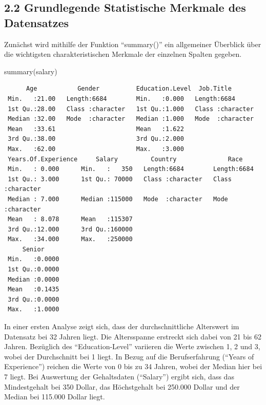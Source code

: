 \documentclass[
  letterpaper,
  DIV=11,
  numbers=noendperiod]{scrartcl}
\newenvironment{Shaded}{\begin{snugshade}}{\end{snugshade}}
\newcommand{\FunctionTok}[1]{\textcolor[rgb]{0.28,0.35,0.67}{#1}}
\newcommand{\NormalTok}[1]{\textcolor[rgb]{0.00,0.23,0.31}{#1}}
\begin{document}
\hypertarget{grundlegende-statistische-merkmale-des-datensatzes}{%
\subsection{2.2 Grundlegende Statistische Merkmale des
Datensatzes}\label{grundlegende-statistische-merkmale-des-datensatzes}}

Zunächst wird mithilfe der Funktion ``summary()'' ein allgemeiner
Überblick über die wichtigsten charakteristischen Merkmale der einzelnen
Spalten gegeben.

\begin{Shaded}
\begin{Highlighting}[]
\FunctionTok{summary}\NormalTok{(salary)}
\end{Highlighting}
\end{Shaded}

\begin{verbatim}
      Age           Gender          Education.Level  Job.Title        
 Min.   :21.00   Length:6684        Min.   :0.000   Length:6684       
 1st Qu.:28.00   Class :character   1st Qu.:1.000   Class :character  
 Median :32.00   Mode  :character   Median :1.000   Mode  :character  
 Mean   :33.61                      Mean   :1.622                     
 3rd Qu.:38.00                      3rd Qu.:2.000                     
 Max.   :62.00                      Max.   :3.000                     
 Years.Of.Experience     Salary         Country              Race          
 Min.   : 0.000      Min.   :   350   Length:6684        Length:6684       
 1st Qu.: 3.000      1st Qu.: 70000   Class :character   Class :character  
 Median : 7.000      Median :115000   Mode  :character   Mode  :character  
 Mean   : 8.078      Mean   :115307                                        
 3rd Qu.:12.000      3rd Qu.:160000                                        
 Max.   :34.000      Max.   :250000                                        
     Senior      
 Min.   :0.0000  
 1st Qu.:0.0000  
 Median :0.0000  
 Mean   :0.1435  
 3rd Qu.:0.0000  
 Max.   :1.0000  
\end{verbatim}

In einer ersten Analyse zeigt sich, dass der durchschnittliche
Alterswert im Datensatz bei 32 Jahren liegt. Die Altersspanne erstreckt
sich dabei von 21 bis 62 Jahren. Bezüglich des ``Education-Level''
variieren die Werte zwischen 1, 2 und 3, wobei der Durchschnitt bei 1
liegt. In Bezug auf die Berufserfahrung (``Years of Experience'')
reichen die Werte von 0 bis zu 34 Jahren, wobei der Median hier bei 7
liegt. Bei Auswertung der Gehaltsdaten (``Salary'') ergibt sich, dass
das Mindestgehalt bei 350 Dollar, das Höchstgehalt bei 250.000 Dollar
und der Median bei 115.000 Dollar liegt.
\end{document}

